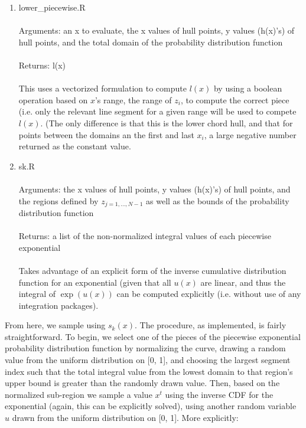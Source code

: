 \documentclass[12pt, oneside]{article}
\begin{document}
\begin{enumerate}
\item lower\_piecewise.R\\\\
Arguments: an x to evaluate, the x values of hull points, y values (h(x)'s) of hull points, and the total domain of the probability distribution function\\\\
Returns: l(x)\\\\
This uses a vectorized formulation to compute \(l(x)\) by using a boolean operation based on \(x\)'s range, the range of \(z_i\), to compute the correct piece (i.e. only the relevant line segment for a given range will be used to compete \(l(x)\).  (The only difference is that this is the lower chord hull, and that for points between the domains an the first and last \(x_i\), a large negative number returned as the constant value.

\item sk.R\\\\
Arguments: the x values of hull points, y values (h(x)'s) of hull points, and the regions defined by \(z_{j=1,...,N-1}\) as well as the bounds of the probability distribution function\\\\
Returns: a list of the non-normalized integral values of each piecewise exponential\\\\
Takes advantage of an explicit form of the inverse cumulative distribution function for an exponential (given that all \(u(x)\) are linear, and thus the integral of \(\exp(u(x))\) can be computed explicitly (i.e. without use of any integration packages).\\

\end{enumerate}

From here, we sample using \(s_k(x)\).  The procedure, as implemented, is fairly straightforward.  To begin, we select one of the pieces of the piecewise exponential probability distribution function by normalizing the curve, drawing a random value from the uniform distribution on [0, 1], and choosing the largest segment index such that the total integral value from the lowest domain to that region's upper bound is greater than the randomly drawn value.  Then, based on the normalized sub-region we sample a value \(x^t\) using the inverse CDF for the exponential (again, this can be explicitly solved), using another random variable \(u\) drawn from the uniform distribution on [0, 1].  More explicitly:
\end{document}
